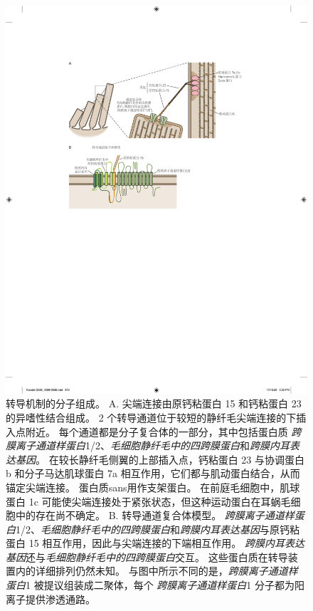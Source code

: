 \begin{figure}[htbp]
	\centering
	\includegraphics[width=1.0\linewidth]{chap26/fig_26_10}
	\caption{转导机制的分子组成。
		A. 尖端连接由原钙粘蛋白 15 和钙粘蛋白 23 的异嗜性结合组成。
		2 个转导通道位于较短的静纤毛尖端连接的下插入点附近。
		每个通道都是分子复合体的一部分，其中包括蛋白质 \textit{跨膜离子通道样蛋白}1/2、\textit{毛细胞静纤毛中的四跨膜蛋白}和\textit{跨膜内耳表达基因}。
		在较长静纤毛侧翼的上部插入点，钙粘蛋白 23 与协调蛋白 b 和分子马达肌球蛋白 7a 相互作用，它们都与肌动蛋白结合，从而锚定尖端连接。
		蛋白质sans用作支架蛋白。
		在前庭毛细胞中，肌球蛋白 1c 可能使尖端连接处于紧张状态，但这种运动蛋白在耳蜗毛细胞中的存在尚不确定。
		B. 转导通道复合体模型。
		\textit{跨膜离子通道样蛋白}1/2、\textit{毛细胞静纤毛中的四跨膜蛋白}和\textit{跨膜内耳表达基因}与原钙粘蛋白 15 相互作用，因此与尖端连接的下端相互作用。
		\textit{跨膜内耳表达基因}还与\textit{毛细胞静纤毛中的四跨膜蛋白}交互。
		这些蛋白质在转导装置内的详细排列仍然未知。
		与图中所示不同的是，\textit{跨膜离子通道样蛋白}1 被提议组装成二聚体，每个 \textit{跨膜离子通道样蛋白}1 分子都为阳离子提供渗透通路\cite{wu2016molecular,pan2018tmc1}。}
	\label{fig:26_10}
\end{figure}


